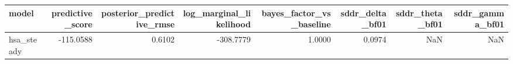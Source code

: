 \begin{tabular}{lrrrrrrr}
\toprule
model & predictive\_score & posterior\_predictive\_rmse & log\_marginal\_likelihood & bayes\_factor\_vs\_baseline & sddr\_delta\_bf01 & sddr\_theta\_bf01 & sddr\_gamma\_bf01 \\
\midrule
hsa\_steady & -115.0588 & 0.6102 & -308.7779 & 1.0000 & 0.0974 & NaN & NaN \\
\bottomrule
\end{tabular}
